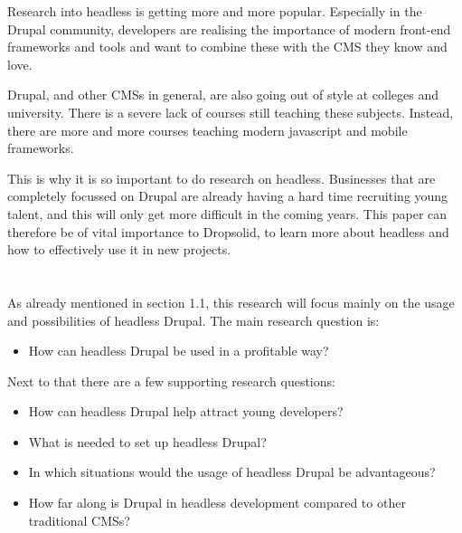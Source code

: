 Research into headless is getting more and more popular. Especially in the Drupal community, developers are realising the importance of modern front-end frameworks and tools and want to combine these with the CMS they know and love. 

Drupal, and other CMSs in general, are also going out of style at colleges and university. There is a severe lack of courses still teaching these subjects. Instead, there are more and more courses teaching modern javascript and mobile frameworks.

This is why it is so important to do research on headless. Businesses that are completely focussed on Drupal are already having a hard time recruiting young talent, and this will only get more difficult in the coming years. This paper can therefore be of vital importance to Dropsolid, to learn more about headless and how to effectively use it in new projects.

\section{}
\label{sec:onderzoeksvraag}

As already mentioned in section 1.1, this research will focus mainly on the usage and possibilities of headless Drupal. The main research question is:
\begin{itemize}
	\item How can headless Drupal be used in a profitable way? 
\end{itemize}

Next to that there are a few supporting research questions:
\begin{itemize}
	\item How can headless Drupal help attract young developers?
	\item What is needed to set up headless Drupal?
	\item In which situations would the usage of headless Drupal be advantageous?
	\item How far along is Drupal in headless development compared to other traditional CMSs?
\end{itemize}

\section{}
\label{sec:onderzoeksdoelstelling}


